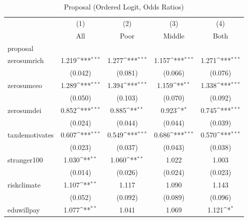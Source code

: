 \begin{table}[htbp]\centering
\def\sym#1{\ifmmode^{#1}\else\(^{#1}\)\fi}
\caption{Proposal (Ordered Logit, Odds Ratios)}
\begin{tabular}{l*{4}{c}}
\toprule
            &\multicolumn{1}{c}{(1)}&\multicolumn{1}{c}{(2)}&\multicolumn{1}{c}{(3)}&\multicolumn{1}{c}{(4)}\\
            &\multicolumn{1}{c}{All}&\multicolumn{1}{c}{Poor}&\multicolumn{1}{c}{Middle}&\multicolumn{1}{c}{Both}\\
\midrule
proposal    &                     &                     &                     &                     \\
zerosumrich &       1.219\sym{***}&       1.277\sym{***}&       1.157\sym{***}&       1.271\sym{***}\\
            &     (0.042)         &     (0.081)         &     (0.066)         &     (0.076)         \\
\addlinespace
zerosumceo  &       1.289\sym{***}&       1.394\sym{***}&       1.159\sym{**} &       1.338\sym{***}\\
            &     (0.050)         &     (0.103)         &     (0.070)         &     (0.092)         \\
\addlinespace
zerosumdei  &       0.852\sym{***}&       0.885\sym{**} &       0.923\sym{*}  &       0.745\sym{***}\\
            &     (0.024)         &     (0.044)         &     (0.044)         &     (0.039)         \\
\addlinespace
taxdemotivates&       0.607\sym{***}&       0.549\sym{***}&       0.686\sym{***}&       0.570\sym{***}\\
            &     (0.023)         &     (0.037)         &     (0.043)         &     (0.038)         \\
\addlinespace
stranger100 &       1.030\sym{**} &       1.060\sym{**} &       1.022         &       1.003         \\
            &     (0.014)         &     (0.026)         &     (0.024)         &     (0.023)         \\
\addlinespace
riskclimate &       1.107\sym{**} &       1.117         &       1.090         &       1.143         \\
            &     (0.052)         &     (0.092)         &     (0.089)         &     (0.096)         \\
\addlinespace
eduwillpay  &       1.077\sym{**} &       1.041         &       1.069         &       1.121\sym{*}  \\

\end{tabular}
\end{table}
